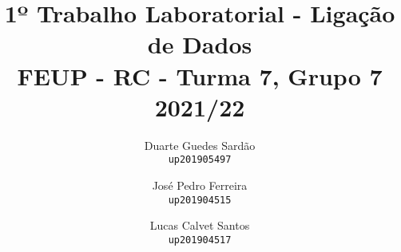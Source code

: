 \author{
  Duarte Guedes Sardão\\
  \texttt{up201905497}
  \and
  José Pedro Ferreira\\
  \texttt{up201904515}
  \and
  Lucas Calvet Santos\\
  \texttt{up201904517}
}
\title{1º Trabalho Laboratorial - Ligação de Dados\\\large FEUP - RC - Turma 7, Grupo 7\\\normalsize 2021/22}
\maketitle
\thispagestyle{empty}
\clearpage
\setcounter{page}{1}